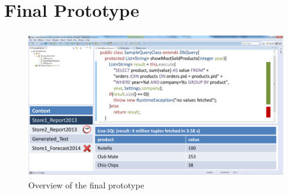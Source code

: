 
\section{Final Prototype}
\label{sec:FINAL_PROTOTYPE}

\begin{figure}
\begin{centering}
    \includegraphics[width=1.0\linewidth]{images/final_prototype}
    \caption{Overview of the final prototype}
    \label{fig:final_prototype_overview}
\end{centering}
\end{figure}

